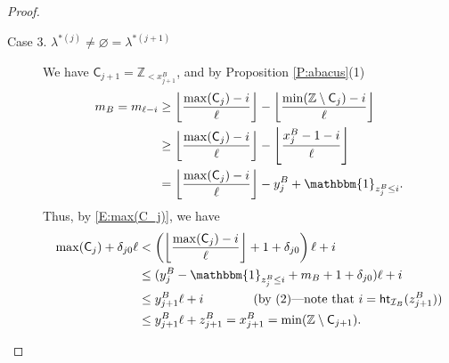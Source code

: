 \documentclass[11pt,a4paper,reqno]{amsart}
\numberwithin{equation}{section}
\theoremstyle{plain}
\theoremstyle{definition}
\theoremstyle{remark}
\numberwithin{equation}{section}
\newcommand{\bbone}{\mathbbm{1}}
\renewcommand{\min}{\mathrm{min}}
\renewcommand{\max}{\mathrm{max}}
\newcommand{\ZZ}{\mathbb{Z}}
\newcommand{\C}{\mathsf{C}}
\newcommand{\Ht}{\mathsf{ht}}
\newcommand{\II}{\mathcal{I}}
\begin{document}
\begin{proof}
\begin{description}
\begin{description}
  \item[Case 3. $\lambda^{*(j)} \ne \varnothing = \lambda^{*(j+1)}$]
  We have $\C_{j+1} = \ZZ_{<x^B_{j+1}}$, and by Proposition \ref{P:abacus}(1)
  \begin{align*}
  m_B = m_{\ell - i}
  &\geq \left \lfloor \frac{\max(\C_{j}) - i}{\ell} \right\rfloor - \left \lfloor \frac{\min(\ZZ\setminus \C_{j}) -i}{\ell} \right\rfloor \\
  &\geq \left \lfloor \frac{\max(\C_{j}) - i}{\ell} \right\rfloor - \left \lfloor \frac{x^B_j -1 -i}{\ell} \right\rfloor \\
  &= \left \lfloor \frac{\max(\C_{j}) - i}{\ell} \right\rfloor - y^B_j + \bbone_{z^B_j \leq i}.
  \end{align*}
  Thus, by \eqref{E:max(C_j)}, we have
  \begin{align*}
  \max(\C_j) + \delta_{j0} \ell
  &< %
    \left( \left \lfloor \frac{\max(\C_j) - i}{\ell} \right \rfloor + 1 + \delta_{j0} \right) \ell + i \\
  &\leq (y^B_j - \bbone_{z^B_j \leq i} + m_B + 1 + \delta_{j0} ) \ell + i \\
  &\leq y^B_{j+1} \ell + i \qquad \qquad (\text{by (2)---note that $i= \Ht_{\II_B}(z^B_{j+1})$}) \\
  &%
  \leq y^B_{j+1}\ell + z^B_{j+1} = x^B_{j+1} = \min(\ZZ \setminus \C_{j+1}).
  \end{align*}


\end{description}
\end{description}
\end{proof}
\end{document}
